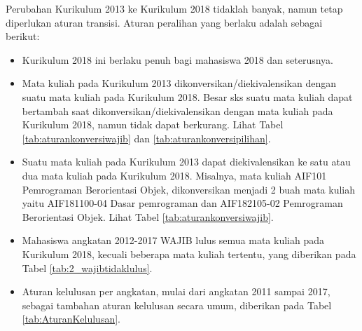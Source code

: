 Perubahan Kurikulum 2013 ke Kurikulum 2018 tidaklah banyak, namun tetap diperlukan aturan transisi. Aturan peralihan yang berlaku adalah sebagai berikut:
\begin{itemize}
	\item Kurikulum 2018 ini berlaku penuh bagi mahasiswa 2018 dan seterusnya.
	\item Mata kuliah pada Kurikulum 2013 dikonversikan/diekivalensikan dengan suatu mata kuliah pada
Kurikulum 2018. Besar sks suatu mata kuliah dapat bertambah saat dikonversikan/diekivalensikan
dengan mata kuliah pada Kurikulum 2018, namun tidak dapat berkurang. Lihat Tabel \ref{tab:aturankonversiwajib} dan \ref{tab:aturankonversipilihan}.
	\item Suatu mata kuliah pada Kurikulum 2013 dapat diekivalensikan ke satu atau dua mata kuliah pada
Kurikulum 2018. Misalnya, mata kuliah AIF101 Pemrograman Berorientasi Objek, dikonversikan
menjadi 2 buah mata kuliah yaitu AIF181100-04 Dasar pemrograman dan AIF182105-02
Pemrograman Berorientasi Objek. Lihat Tabel \ref{tab:aturankonversiwajib}.
	\item Mahasiswa angkatan 2012-2017 WAJIB  lulus semua mata  kuliah pada Kurikulum 2018, kecuali beberapa mata kuliah tertentu, yang diberikan pada Tabel \ref{tab:2_wajibtidaklulus}.
	\item Aturan kelulusan per angkatan, mulai dari angkatan 2011 sampai 2017, sebagai tambahan aturan kelulusan secara umum, diberikan pada Tabel \ref{tab:AturanKelulusan}.
\end{itemize}


